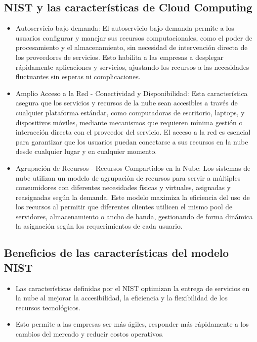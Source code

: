 {        \subsection{NIST y las caracter{\'i}sticas de Cloud Computing}
            \begin{itemize}
                \item Autoservicio bajo demanda: El autoservicio bajo demanda permite a los usuarios configurar y manejar sus recursos computacionales, como el poder de procesamiento y el almacenamiento, sin necesidad de intervenci{\'o}n directa de los proveedores de servicios. Esto habilita a las empresas a desplegar r{\'a}pidamente aplicaciones y servicios, ajustando los recursos a las necesidades fluctuantes sin esperas ni complicaciones.
                \item Amplio Acceso a la Red - Conectividad y Disponibilidad: Esta caracter{\'i}stica asegura que los servicios y recursos de la nube sean accesibles a trav{\'e}s de cualquier plataforma est{\'a}ndar, como computadoras de escritorio, laptops, y dispositivos m{\'o}viles, mediante mecanismos que requieren m{\'i}nima gesti{\'o}n o interacci{\'o}n directa con el proveedor del servicio. El acceso a la red es esencial para garantizar que los usuarios puedan conectarse a sus recursos en la nube desde cualquier lugar y en cualquier momento.
                \item Agrupaci{\'o}n de Recursos - Recursos Compartidos en la Nube:  Los sistemas de nube utilizan un modelo de agrupaci{\'o}n de recursos para servir a m{\'u}ltiples consumidores con diferentes necesidades f{\'i}sicas y virtuales, asignadas y reasignadas seg{\'u}n la demanda. Este modelo maximiza la eficiencia del uso de los recursos al permitir que diferentes clientes utilicen el mismo pool de servidores, almacenamiento o ancho de banda, gestionando de forma din{\'a}mica la asignaci{\'o}n seg{\'u}n los requerimientos de cada usuario. 
            \end{itemize}
        \subsection[Beneficios de Cloud Computing]{Beneficios de las caracter{\'i}sticas del modelo NIST}
            \begin{itemize}
                \item Las caracter{\'i}sticas definidas por el NIST optimizan la entrega de servicios en la nube al mejorar la accesibilidad, la eficiencia y la flexibilidad de los recursos tecnol{\'o}gicos. 
                \item Esto permite a las empresas ser m{\'a}s {\'a}giles, responder m{\'a}s r{\'a}pidamente a los cambios del mercado y reducir costos operativos.
            \end{itemize}
}
